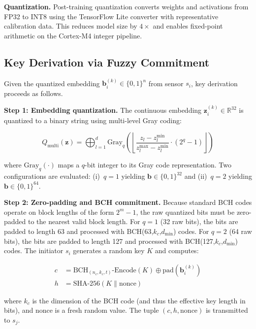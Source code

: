 \documentclass[sensors,article,submit,pdftex,moreauthors]{Definitions/mdpi}
\begin{document}
\textbf{Quantization.} Post-training quantization converts weights and activations from FP32 to INT8 using the TensorFlow Lite converter with representative calibration data. This reduces model size by $4\times$ and enables fixed-point arithmetic on the Cortex-M4 integer pipeline.

\subsection{Key Derivation via Fuzzy Commitment}
\label{subsec:key_derivation}

Given the quantized embedding $\mathbf{b}_i^{(k)} \in \{0,1\}^n$ from sensor $s_i$, key derivation proceeds as follows.

\textbf{Step 1: Embedding quantization.} The continuous embedding $\mathbf{z}_i^{(k)} \in \mathbb{R}^{32}$ is quantized to a binary string using multi-level Gray coding:

\begin{equation}
\label{eq:multilevel_quant}
Q_{\text{multi}}(\mathbf{z}) = \bigoplus_{l=1}^{d} \text{Gray}_q\!\left(\left\lfloor \frac{z_l - z_l^{\min}}{z_l^{\max} - z_l^{\min}} \cdot (2^q - 1) \right\rfloor\right)
\end{equation}

where $\text{Gray}_q(\cdot)$ maps a $q$-bit integer to its Gray code representation. Two configurations are evaluated: (i)~$q = 1$ yielding $\mathbf{b} \in \{0,1\}^{32}$ and (ii)~$q = 2$ yielding $\mathbf{b} \in \{0,1\}^{64}$.

\textbf{Step 2: Zero-padding and BCH commitment.} Because standard BCH codes operate on block lengths of the form $2^m - 1$, the raw quantized bits must be zero-padded to the nearest valid block length. For $q = 1$ (32 raw bits), the bits are padded to length 63 and processed with BCH(63,$k_c$,$d_{\min}$) codes. For $q = 2$ (64 raw bits), the bits are padded to length 127 and processed with BCH(127,$k_c$,$d_{\min}$) codes. The initiator $s_i$ generates a random key $K$ and computes:

\begin{align}
\label{eq:commitment}
c &= \text{BCH}_{(n_c, k_c, t)}\text{-Encode}(K) \oplus \text{pad}(\mathbf{b}_i^{(k)}) \\
h &= \text{SHA-256}(K \| \text{nonce})
\end{align}

where $k_c$ is the dimension of the BCH code (and thus the effective key length in bits), and $\text{nonce}$ is a fresh random value. The tuple $(c, h, \text{nonce})$ is transmitted to $s_j$.
\end{document}
